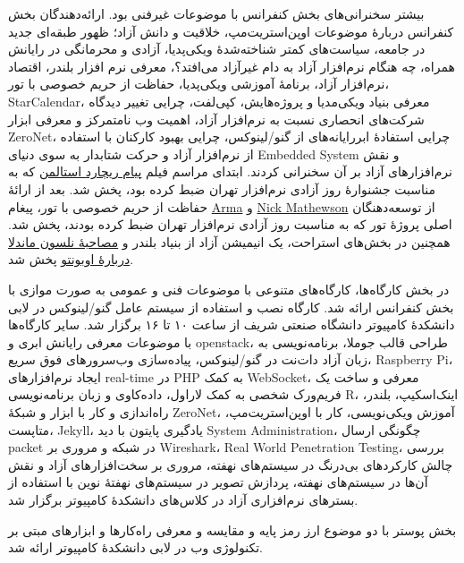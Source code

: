 \documentclass{article}
\begin{document}
{بیشتر سخنرانی‌های بخش کنفرانس با موضوعات غیرفنی بود. ارائه‌دهندگان بخش کنفرانس دربارهٔ موضوعات اوپن‌استریت‌مپ، خلاقیت و دانش آزاد؛ ظهور طبقه‌ای جدید در جامعه، سیاست‌های کمتر شناخته‌شدهٔ ویکی‌پدیا، آزادی و محرمانگی در رایانش همراه، چه هنگام نرم‌افزار آزاد به دام غیرآزاد می‌افتد؟، معرفی نرم افزار بلندر، اقتصاد نرم‌افزار آزاد، برنامهٔ آموزشی ویکی‌پدیا، حفاظت از حریم خصوصی با تور، StarCalendar، معرفی بنیاد ویکی‌مدیا و پروژه‌هایش، کپی‌لفت، چرایی تغییر دیدگاه شرکت‌های انحصاری نسبت به نرم‌افزار آزاد، اهمیت وب نامتمرکز و معرفی ابزار ZeroNet، چرایی استفادهٔ ابررایانه‌های از گنو/لینوکس، چرایی بهبود کارکنان با استفاده از نرم‌افزار آزاد و حرکت شتابدار به سوی دنیای Embedded System و نقش نرم‌افزارهای آزاد بر آن سخنرانی کردند. ابتدای مراسم فیلم
\href{https://www.youtube.com/watch?v=gjhJ6-0kwzc}{پیام ریچارد استالمن}
که به مناسبت جشنوارهٔ روز آزادی نرم‌افزار تهران ضبط کرده بود، پخش شد. بعد از ارائهٔ حفاظت از حریم خصوصی با تور، پیغام 
\href{https://www.youtube.com/watch?v=UfYzYKL-OUU&list=PLzkZTZKm4j8HDREDT5RXSpHJVmy06pN0D&index=21}{Arma} و
\href{https://www.youtube.com/watch?v=42RTbWI-TQY&list=PLzkZTZKm4j8HDREDT5RXSpHJVmy06pN0D&index=20}{Nick Mathewson}
از توسعه‌دهنگان اصلی پروژهٔ تور که به مناسبت روز آزادی نرم‌افزار تهران ضبط کرده بودند، پخش شد. همچنین در بخش‌‌های استراحت، یک انیمیشن آزاد از بنیاد بلندر و
\href{https://upload.wikimedia.org/wikipedia/commons/0/0c/Experience_ubuntu.ogg}{مصاحبهٔ نلسون ماندلا دربارهٔ اوبونتو} پخش شد.

در بخش کارگاه‌ها، کارگاه‌های متنوعی با موضوعات فنی و عمومی به صورت موازی با بخش کنفرانس ارائه شد. کارگاه نصب و استفاده از سیستم عامل گنو/لینوکس در لابی دانشکدهٔ کامپیوتر دانشگاه صنعتی شریف از ساعت ۱۰ تا ۱۶ برگزار شد. سایر کارگاه‌ها با موضوعات معرفی رایانش ابری و openstack، طراحی قالب جوملا، برنامه‌نویسی به زبان آزاد دات‌نت در گنو/لینوکس، پیاده‌سازی وب‌سرورهای فوق سریع، Raspberry Pi، ایجاد نرم‌افزارهای real-time در PHP به کمک WebSocket، معرفی و ساخت یک فریم‌ورک شخصی به کمک لاراول، داده‌کاوی و زبان برنامه‌نویسی R، اینک‌اسکیپ، بلندر، راه‌اندازی و کار با ابزار و شبکهٔ ZeroNet، آموزش ویکی‌نویسی، کار با اوپن‌استریت‌مپ، متاپست، Jekyll، یادگیری پایتون با دید System Administration، چگونگی ارسال packet در شبکه و مروری بر Wireshark، Real World Penetration Testing، بررسی چالش کارکردهای بی‌درنگ در سیستم‌های نهفته، مروری بر سخت‌افزارهای آزاد و نقش آن‌ها در سیستم‌های نهفته، پردازش تصویر در سیستم‌های نهفتهٔ نوین با استفاده از بسترهای نرم‌افزاری آزاد در کلاس‌های دانشکدهٔ کامپیوتر برگزار شد.

بخش پوستر با دو موضوع ارز رمز پایه و مقایسه و معرفی راه‌کارها و ابزارهای مبتی بر تکنولوژی وب در لابی دانشکدهٔ کامپیوتر ارائه شد.

}
\end{document}
